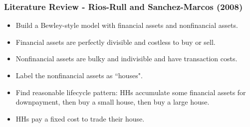 \documentclass[handout]{beamer}
\begin{document}
\begin{frame}
\frametitle{Literature Review - Rios-Rull and Sanchez-Marcos (2008)}

\begin{itemize}[<+->]
\item Build a Bewley-style model with financial assets and nonfinancial assets.
\bigskip
\item Financial assets are perfectly divisible and costless to buy or sell.
\bigskip
\item Nonfinancial assets are bulky and indivisible and have transaction costs.
\bigskip
\item Label the nonfinancial assets as ``houses".
\bigskip
\item Find reasonable lifecycle pattern: HHs accumulate some financial assets for downpayment, then buy a small house, then buy a large house.
\bigskip
\item HHs pay a fixed cost to trade their house.
\end{itemize}

\end{frame}
\end{document}
